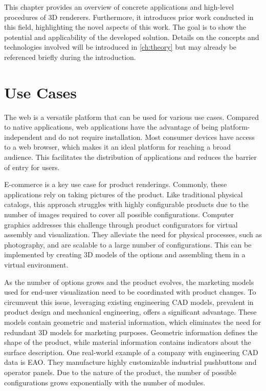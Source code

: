 
This chapter provides an overview of concrete applications and high-level procedures of 3D renderers. Furthermore, it introduces prior work conducted in this field, highlighting the novel aspects of this work. The goal is to show the potential and applicability of the developed solution. Details on the concepts and technologies involved will be introduced in \autoref{ch:theory} but may already be referenced briefly during the introduction.

\section{Use Cases}

The web is a versatile platform that can be used for various use cases. Compared to native applications, web applications have the advantage of being platform-independent and do not require installation. Most consumer devices have access to a web browser, which makes it an ideal platform for reaching a broad audience. This facilitates the distribution of applications and reduces the barrier of entry for users.

E-commerce is a key use case for product renderings. Commonly, these applications rely on taking pictures of the product. Like traditional physical catalogs, this approach struggles with highly configurable products due to the number of images required to cover all possible configurations. Computer graphics addresses this challenge through product configurators for virtual assembly and visualization. They alleviate the need for physical processes, such as photography, and are scalable to a large number of configurations. This can be implemented by creating 3D models of the options and assembling them in a virtual environment.

As the number of options grows and the product evolves, the marketing models used for end-user visualization need to be coordinated with product changes. To circumvent this issue, leveraging existing engineering \gls{CAD} models, prevalent in product design and mechanical engineering, offers a significant advantage. These models contain geometric and material information, which eliminates the need for redundant 3D models for marketing purposes. Geometric information defines the shape of the product, while material information contains indicators about the surface description. One real-world example of a company with engineering \gls{CAD} data is EAO. They manufacture highly customizable industrial pushbuttons and operator panels. Due to the nature of the product, the number of possible configurations grows exponentially with the number of modules.

